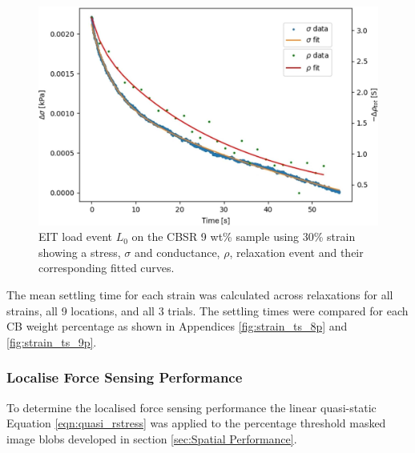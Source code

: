 \begin{figure}[H]
    \centering
    \includegraphics[width=0.7\linewidth]{Figures/2D Push event 0 - CBSR 9 wt 30p strain - 2D compression.jpg}
    \caption{EIT load event $L_0$ on the CBSR 9 wt\% sample using 30\% strain showing a stress, $\sigma$ and conductance, $\rho$, relaxation event and their corresponding fitted curves.}
    \label{fig:blob_global_relaxation}
\end{figure}

The mean settling time for each strain was calculated across relaxations for all strains, all 9 locations, and all 3 trials. The settling times were compared for each CB weight percentage as shown in Appendices \ref{fig:strain_ts_8p} and \ref{fig:strain_ts_9p}.

\subsubsection{Localise Force Sensing Performance}\label{sec:Localised Force Sensing Performance2}
To determine the localised force sensing performance the linear quasi-static Equation \ref{eqn:quasi_rstress} was applied to the percentage threshold masked image blobs developed in section \ref{sec:Spatial Performance}.

